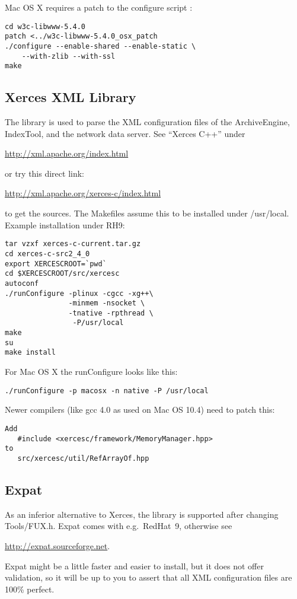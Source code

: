 \noindent Mac OS X requires a patch to the configure script \cite{darwinports}:
\begin{lstlisting}[keywordstyle=\sffamily]
cd w3c-libwww-5.4.0
patch <../w3c-libwww-5.4.0_osx_patch
./configure --enable-shared --enable-static \
    --with-zlib --with-ssl
make
\end{lstlisting}

\subsection{Xerces XML Library}
The  library is used to parse the XML configuration files of the
ArchiveEngine, IndexTool, and the network data server.
See ``Xerces C++'' under
\begin{center}
\href{http://xml.apache.org/index.html}{http://xml.apache.org/index.html}
\end{center}
or try this direct link:
\begin{center}
\href{http://xml.apache.org/xerces-c/index.html}
     {http://xml.apache.org/xerces-c/index.html}
\end{center}
to get the sources. The Makefiles assume this to be installed under /usr/local.
Example installation under RH9:
\begin{lstlisting}[keywordstyle=\sffamily]
tar vzxf xerces-c-current.tar.gz 
cd xerces-c-src2_4_0
export XERCESCROOT=`pwd`
cd $XERCESCROOT/src/xercesc
autoconf
./runConfigure -plinux -cgcc -xg++\
               -minmem -nsocket \
               -tnative -rpthread \
                -P/usr/local
make
su
make install
\end{lstlisting}

\noindent For Mac OS X the runConfigure looks like this:
\begin{lstlisting}[keywordstyle=\sffamily]
./runConfigure -p macosx -n native -P /usr/local
\end{lstlisting}

\noindent Newer compilers (like gcc 4.0 as used on Mac OS 10.4)
need to patch this:
\begin{lstlisting}[keywordstyle=\sffamily]
Add
   #include <xercesc/framework/MemoryManager.hpp>
to
   src/xercesc/util/RefArrayOf.hpp
\end{lstlisting}



\subsection{Expat}
As an inferior alternative to Xerces, the  library is supported
after changing Tools/FUX.h. Expat comes with e.g.\ RedHat~9,
otherwise see
\begin{center}
\href{http://expat.sourceforge.net}{http://expat.sourceforge.net}.
\end{center}
Expat might be a little faster and easier to install, but it does not
offer validation, so it will be up to you to assert that all XML
configuration files are 100\% perfect.

